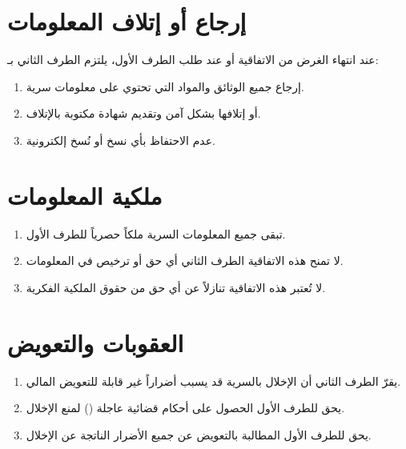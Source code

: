 \documentclass[12pt,a4paper]{article}
\begin{document}
\section{إرجاع أو إتلاف المعلومات}
\label{sec:return}
عند انتهاء الغرض من الاتفاقية أو عند طلب الطرف الأول، يلتزم الطرف الثاني بـ:
\begin{enumerate}
    \item إرجاع جميع الوثائق والمواد التي تحتوي على معلومات سرية.
    \item أو إتلافها بشكل آمن وتقديم شهادة مكتوبة بالإتلاف.
    \item عدم الاحتفاظ بأي نسخ أو نُسخ إلكترونية.
\end{enumerate}

\section{ملكية المعلومات}
\label{sec:ownership}
\begin{enumerate}
    \item تبقى جميع المعلومات السرية ملكاً حصرياً للطرف الأول.
    \item لا تمنح هذه الاتفاقية الطرف الثاني أي حق أو ترخيص في المعلومات.
    \item لا تُعتبر هذه الاتفاقية تنازلاً عن أي حق من حقوق الملكية الفكرية.
\end{enumerate}

\section{العقوبات والتعويض}
\label{sec:remedies}
\begin{enumerate}
    \item يقرّ الطرف الثاني أن الإخلال بالسرية قد يسبب أضراراً غير قابلة للتعويض المالي.
    \item يحق للطرف الأول الحصول على أحكام قضائية عاجلة () لمنع الإخلال.
    \item يحق للطرف الأول المطالبة بالتعويض عن جميع الأضرار الناتجة عن الإخلال.
\end{enumerate}

\end{document}
